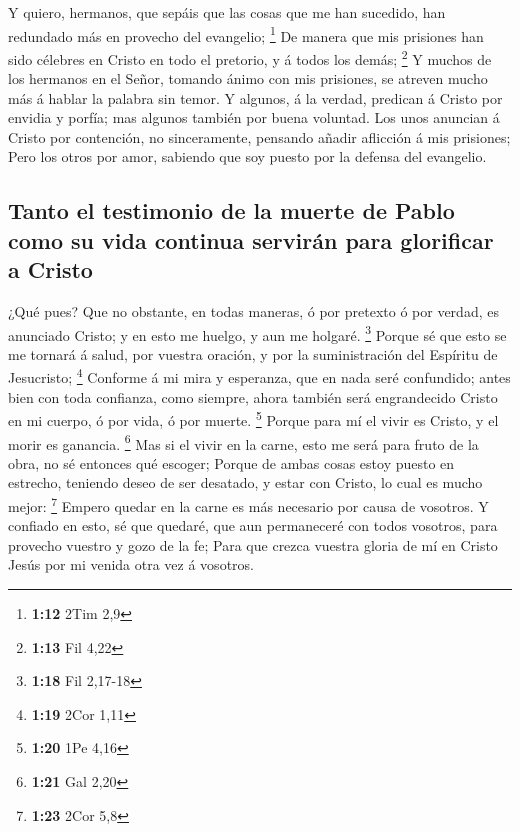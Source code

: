  Y quiero, hermanos, que sepáis que las cosas que me han
sucedido, han redundado más en provecho del evangelio; \footnote{\textbf{1:12}
  2Tim 2,9}  De manera que mis prisiones han sido
célebres en Cristo en todo el pretorio, y á todos los demás; \footnote{\textbf{1:13}
  Fil 4,22}  Y muchos de los hermanos en el Señor,
tomando ánimo con mis prisiones, se atreven mucho más á hablar la
palabra sin temor.  Y algunos, á la verdad, predican á
Cristo por envidia y porfía; mas algunos también por buena voluntad.
 Los unos anuncian á Cristo por contención, no
sinceramente, pensando añadir aflicción á mis prisiones; 
Pero los otros por amor, sabiendo que soy puesto por la defensa del
evangelio.

\hypertarget{tanto-el-testimonio-de-la-muerte-de-pablo-como-su-vida-continua-serviruxe1n-para-glorificar-a-cristo}{%
\subsection{Tanto el testimonio de la muerte de Pablo como su vida
continua servirán para glorificar a
Cristo}\label{tanto-el-testimonio-de-la-muerte-de-pablo-como-su-vida-continua-serviruxe1n-para-glorificar-a-cristo}}

 ¿Qué pues? Que no obstante, en todas maneras, ó por
pretexto ó por verdad, es anunciado Cristo; y en esto me huelgo, y aun
me holgaré. \footnote{\textbf{1:18} Fil 2,17-18}  Porque
sé que esto se me tornará á salud, por vuestra oración, y por la
suministración del Espíritu de Jesucristo; \footnote{\textbf{1:19} 2Cor
  1,11}  Conforme á mi mira y esperanza, que en nada seré
confundido; antes bien con toda confianza, como siempre, ahora también
será engrandecido Cristo en mi cuerpo, ó por vida, ó por muerte.
\footnote{\textbf{1:20} 1Pe 4,16}  Porque para mí el
vivir es Cristo, y el morir es ganancia. \footnote{\textbf{1:21} Gal
  2,20}  Mas si el vivir en la carne, esto me será para
fruto de la obra, no sé entonces qué escoger;  Porque de
ambas cosas estoy puesto en estrecho, teniendo deseo de ser desatado, y
estar con Cristo, lo cual es mucho mejor: \footnote{\textbf{1:23} 2Cor
  5,8}  Empero quedar en la carne es más necesario por
causa de vosotros.  Y confiado en esto, sé que quedaré,
que aun permaneceré con todos vosotros, para provecho vuestro y gozo de
la fe;  Para que crezca vuestra gloria de mí en Cristo
Jesús por mi venida otra vez á vosotros.

